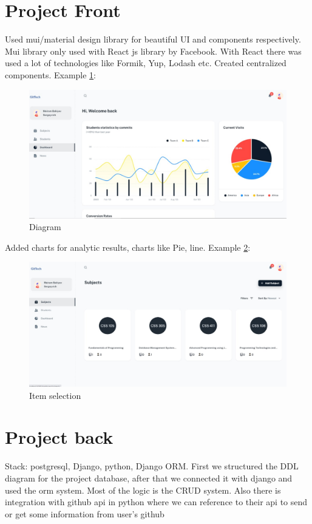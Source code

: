 \section{Project Front}
Used mui/material design library for beautiful UI and components respectively. Mui library only used with React js library by Facebook. With React there was used a lot of technologies like Formik, Yup, Lodash etc.
Created centralized components. Example \ref{fig:dgrm}:
\begin{figure}[ht]
    \centering
    \includegraphics[scale=0.5]{diagramsfnt.jpg}
    \caption{Diagram}
    \label{fig:dgrm}
\end{figure}
Added charts for analytic results, charts like Pie, line. Example \ref{fig:sbj}:
\begin{figure}[ht]
    \centering
    \includegraphics[scale=0.5]{subjectsfnt.jpg}
    \caption{Item selection}
    \label{fig:sbj}
\end{figure}

\section{Project back}
Stack: postgresql, Django, python, Django ORM. First we structured the DDL diagram for the project database, after that we connected it with django and used the orm system. Most of the logic is the CRUD system. Also there is integration with github api in python where we can reference to their api to send or get some information from user’s github
